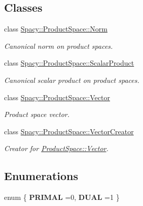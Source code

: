 \subsection*{Classes}
\begin{DoxyCompactItemize}
\item 
class \hyperlink{classSpacy_1_1ProductSpace_1_1Norm}{Spacy\+::\+Product\+Space\+::\+Norm}
\begin{DoxyCompactList}\small\item\em Canonical norm on product spaces. \end{DoxyCompactList}\item 
class \hyperlink{classSpacy_1_1ProductSpace_1_1ScalarProduct}{Spacy\+::\+Product\+Space\+::\+Scalar\+Product}
\begin{DoxyCompactList}\small\item\em Canonical scalar product on product spaces. \end{DoxyCompactList}\item 
class \hyperlink{classSpacy_1_1ProductSpace_1_1Vector}{Spacy\+::\+Product\+Space\+::\+Vector}
\begin{DoxyCompactList}\small\item\em Product space vector. \end{DoxyCompactList}\item 
class \hyperlink{classSpacy_1_1ProductSpace_1_1VectorCreator}{Spacy\+::\+Product\+Space\+::\+Vector\+Creator}
\begin{DoxyCompactList}\small\item\em Creator for \hyperlink{classSpacy_1_1ProductSpace_1_1Vector}{Product\+Space\+::\+Vector}. \end{DoxyCompactList}\end{DoxyCompactItemize}
\subsection*{Enumerations}
\begin{DoxyCompactItemize}
\item 
\hypertarget{group__ProductSpaceGroup_gaf65a00de69cbc808db7cddb728796894}{}enum \{ {\bfseries P\+R\+I\+M\+A\+L} =0, 
{\bfseries D\+U\+A\+L} =1
 \}\label{group__ProductSpaceGroup_gaf65a00de69cbc808db7cddb728796894}

\end{DoxyCompactItemize}
